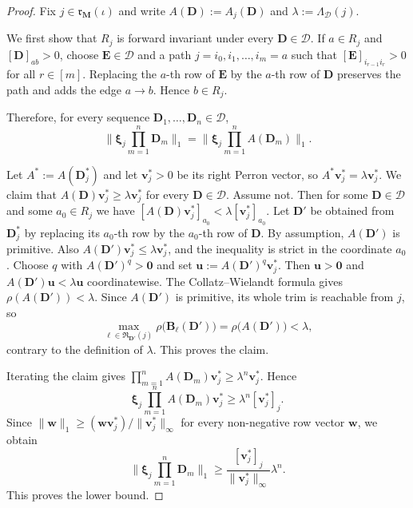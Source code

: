 \documentclass[10pt,a4paper]{amsart}
\newcommand*{\bbbxi}{\boldsymbol{\xi}}
\begin{document}
\begin{proof}
Fix $j\in\mathfrak r_{\mathbf M}(\iota)$ and write
$A(\mathbf D):=A_j(\mathbf D)$ and $\lambda:=\Lambda_{\mathcal D}(j)$.

We first show that $R_j$ is forward invariant under every $\mathbf D\in\mathcal D$.
If $a\in R_j$ and $[\mathbf D]_{ab}>0$, choose $\mathbf E\in\mathcal D$ and a path
$j=i_0,i_1,\ldots,i_m=a$ such that $[\mathbf E]_{i_{r-1}i_r}>0$ for all $r\in[m]$.
Replacing the $a$-th row of $\mathbf E$ by the $a$-th row of $\mathbf D$ preserves the path and adds the edge $a\to b$.
Hence $b\in R_j$.

Therefore, for every sequence $\mathbf D_1,\ldots,\mathbf D_n\in\mathcal D$,
\[
\bigg\|
\bbbxi_j\prod_{m=1}^n \mathbf D_m
\bigg\|_1
=
\bigg\|
\bbbxi_j\prod_{m=1}^n A(\mathbf D_m)
\bigg\|_1.
\]

Let $A^*:=A(\mathbf D_j^*)$ and let $\mathbf v_j^*>0$ be its right Perron vector, so
$A^*\mathbf v_j^*=\lambda\mathbf v_j^*$.
We claim that $A(\mathbf D)\mathbf v_j^*\ge \lambda\mathbf v_j^*$ for every $\mathbf D\in\mathcal D$.
Assume not.
Then for some $\mathbf D\in\mathcal D$ and some $a_0\in R_j$ we have
$[A(\mathbf D)\mathbf v_j^*]_{a_0}<\lambda[\mathbf v_j^*]_{a_0}$.
Let $\mathbf D'$ be obtained from $\mathbf D_j^*$ by replacing its $a_0$-th row by the $a_0$-th row of $\mathbf D$.
By assumption, $A(\mathbf D')$ is primitive.
Also $A(\mathbf D')\mathbf v_j^*\le \lambda\mathbf v_j^*$, and the inequality is strict in the coordinate $a_0$.
Choose $q$ with $A(\mathbf D')^q>\mathbf 0$ and set $\mathbf u:=A(\mathbf D')^q\mathbf v_j^*$.
Then $\mathbf u>\mathbf 0$ and $A(\mathbf D')\mathbf u<\lambda\mathbf u$ coordinatewise.
The Collatz--Wielandt formula gives $\rho(A(\mathbf D'))<\lambda$.
Since $A(\mathbf D')$ is primitive, its whole trim is reachable from $j$, so
\[
\max_{\ell\in\mathfrak R_{\mathbf D'}(j)}
\rho\big(\mathbf B_\ell(\mathbf D')\big)
=
\rho\big(A(\mathbf D')\big)
<
\lambda,
\]
contrary to the definition of $\lambda$.
This proves the claim.

Iterating the claim gives
$\prod_{m=1}^n A(\mathbf D_m)\mathbf v_j^*\ge \lambda^n\mathbf v_j^*$.
Hence
\[
\bbbxi_j\prod_{m=1}^n A(\mathbf D_m)\mathbf v_j^*
\ge
\lambda^n[\mathbf v_j^*]_j.
\]
Since $\|\mathbf w\|_1\ge (\mathbf w\mathbf v_j^*)/\|\mathbf v_j^*\|_\infty$ for every non-negative row vector $\mathbf w$, we obtain
\[
\bigg\|
\bbbxi_j\prod_{m=1}^n \mathbf D_m
\bigg\|_1
\ge
\frac{[\mathbf v_j^*]_j}{\|\mathbf v_j^*\|_\infty}\lambda^n.
\]
This proves the lower bound.


\end{proof}
\end{document}
